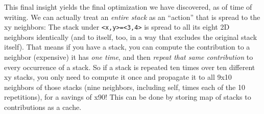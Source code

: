 \documentclass[]{article}
\begin{document}
This final insight yields the final optimization we have discovered, as of time
of writing. We can actually treat an \emph{entire stack} as an ``action'' that
is spread to the xy neighbors: The stack under
\texttt{\textless{}x,y\textgreater{}=\textless{}3,4\textgreater{}} is spread to
all its eight 2D neighbors identically (and to itself, too, in a way that
excludes the original stack itself). That means if you have a stack, you can
compute the contribution to a neighbor (expensive) it has \emph{one time}, and
then \emph{repeat that same contribution} to every occurrence of a stack. So if
a stack is repeated ten times over ten different xy stacks, you only need to
compute it once and propagate it to all 9x10 neighbors of those stacks (nine
neighbors, including self, times each of the 10 repetitions), for a savings of
x90! This can be done by storing map of stacks to contributions as a cache.
\end{document}
